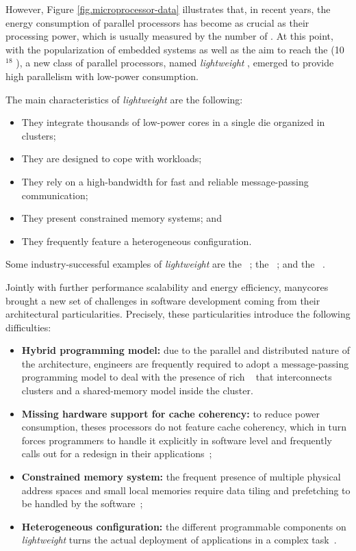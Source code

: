 	However, Figure \ref{fig.microprocessor-data} illustrates that, in recent years,
	the energy consumption of parallel processors has become as crucial as their
	processing power, which is usually measured by the number of \flops.
	At this point, with the popularization of embedded systems as well as the aim
	to reach the \exascale (10$^{18}$ \flops), a new class of parallel processors,
	named \textit{lightweight} \manycores, emerged to provide high parallelism
	with low-power consumption.

	The main characteristics of \textit{lightweight} \manycores are the following:
	\begin{itemize}
		\item They integrate thousands of low-power cores in a single die organized in clusters;
		\item They are designed to cope with \mimd workloads;
		\item They rely on a high-bandwidth \noc for fast and reliable message-passing communication;
		\item They present constrained memory systems; and
		\item They frequently feature a heterogeneous configuration.
	\end{itemize}
	Some industry-successful examples of \textit{lightweight} \manycores are
	the \mppa~\cite{DeDinechin2013-1};
	the \epiphany~\cite{olofsson2014}; and
	the \taihulight~\cite{zheng2015}.

	Jointly with further performance scalability and energy efficiency, manycores brought a new
	set of challenges in software development coming from their architectural particularities.
	Precisely, these particularities introduce the following difficulties:
	\begin{itemize}
		\item \textbf{Hybrid programming model:} due to the parallel and distributed nature of
			the architecture, engineers are frequently required to adopt a message-passing
			programming model to deal with the presence of rich \nocs~\cite{kelly2013} that
			interconnects clusters and a shared-memory model inside the cluster.
		\item \textbf{Missing hardware support for cache coherency:} to reduce power consumption,
			theses processors do not feature cache coherency, which in turn forces programmers to
			handle it explicitly in software level and frequently calls out for a redesign in their
			applications~\cite{francesquini2015};
		\item \textbf{Constrained memory system:} the frequent presence of multiple physical
			address spaces and small local memories require data tiling and prefetching to be
			handled by the software~\cite{Castro2016};
		\item \textbf{Heterogeneous configuration:} the different programmable components on
			\textit{lightweight} \manycores turns the actual deployment of applications in a
			complex task~\cite{barbalace2015}.
	\end{itemize}

